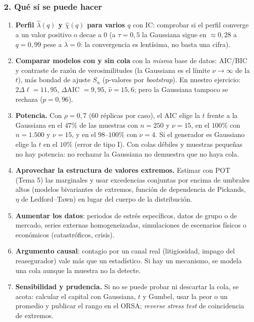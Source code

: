 \documentclass[a4paper,12pt]{article}
\begin{document}
\subsubsection*{2. Qué sí se puede hacer}
\begin{enumerate}[leftmargin=*,itemsep=2pt]
\item \textbf{Perfil $\hat\lambda(q)$ y $\hat\chi(q)$ para varios $q$} con IC: comprobar si el perfil converge a un valor positivo o decae a 0 (a $\tau=0{,}5$ la Gaussiana sigue en $\approx0{,}28$ a $q=0{,}99$ pese a $\lambda=0$: la convergencia es lentísima, no basta una cifra).
\item \textbf{Comparar modelos con y sin cola} con la \emph{misma} base de datos: AIC/BIC y contraste de razón de verosimilitudes (la Gaussiana es el límite $\nu\to\infty$ de la $t$), más bondad de ajuste $S_n$ (p-valores por \emph{bootstrap}). En nuestro ejercicio: $2\Delta\ell=11{,}95$, $\Delta$AIC $=9{,}95$, $\hat\nu=15{,}6$; pero la Gaussiana tampoco se rechaza ($p=0{,}96$).
\item \textbf{Potencia.} Con $\rho=0{,}7$ (60 réplicas por caso), el AIC elige la $t$ frente a la Gaussiana en el $47\%$ de las muestras con $n=250$ y $\nu=15$, en el $100\%$ con $n=1.500$ y $\nu=15$, y en el $98$--$100\%$ con $\nu=4$. Si el generador es Gaussiano elige la $t$ en el $10\%$ (error de tipo I). Con colas débiles y muestras pequeñas no hay potencia: no rechazar la Gaussiana no demuestra que no haya cola.
\item \textbf{Aprovechar la estructura de valores extremos.} Estimar con POT (Tema 5) las marginales y usar excedencias conjuntas por encima de umbrales altos (modelos bivariantes de extremos, función de dependencia de Pickands, $\eta$ de Ledford--Tawn) en lugar del cuerpo de la distribución.
\item \textbf{Aumentar los datos}: periodos de estrés específicos, datos de grupo o de mercado, series externas homogeneizadas, simulaciones de escenarios físicos o económicos (catastróficos, crisis).
\item \textbf{Argumento causal}: contagio por un canal real (litigiosidad, impago del reasegurador) vale más que un estadístico. Si hay un mecanismo, se modela una cola aunque la muestra no la detecte.
\item \textbf{Sensibilidad y prudencia.} Si no se puede probar ni descartar la cola, se acota: calcular el capital con Gaussiana, $t$ y Gumbel, usar la peor o un promedio y publicar el rango en el ORSA; \emph{reverse stress test} de coincidencia de extremos.
\end{enumerate}
\end{document}

